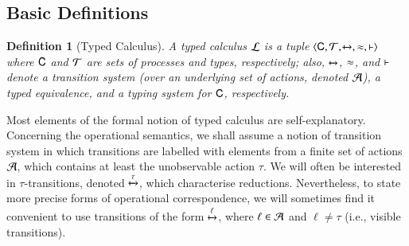 \documentclass[preprint,11pt]{elsarticle}
\newtheorem{definition}{Definition}[section]
\begin{document}
{{\subsection{Basic Definitions}

\begin{definition}[Typed Calculus]\label{d:tcalculus}%
	A \emph{typed calculus} $\mathcal{L}$ is a tuple
	$\langle \mathsf{C}, \cal{T}, \xmapsto{~}, \approx, \vdash \rangle$
	where $\mathsf{C}$ and $\cal{T}$ are sets of processes and types, 
	respectively; also, $\xmapsto{}$, $\approx$, and $\vdash$ 
	denote a transition system (over an underlying set of actions, denoted $\cal{A}$), a typed equivalence,
	and a typing system for $\mathsf{C}$, respectively. 
\end{definition}

%
%
%
%


Most elements of the formal notion of typed calculus are self-explanatory. 
Concerning the operational semantics, we shall assume a notion of transition system in which transitions are labelled with 
elements from a finite set of actions $\cal{A}$, which contains at least the unobservable action $\tau$. 
We will often be interested in $\tau$-transitions, denoted $\xmapsto{\tau}$, which characterise reductions. 
Nevertheless, to state more precise forms of operational correspondence, we 
will sometimes find it convenient to use transitions of 
the form $\xmapsto{\ell}$,
where $\ell \in \cal{A}$ and $\ell \neq \tau$ (i.e., visible transitions). 

}}
\end{document}

